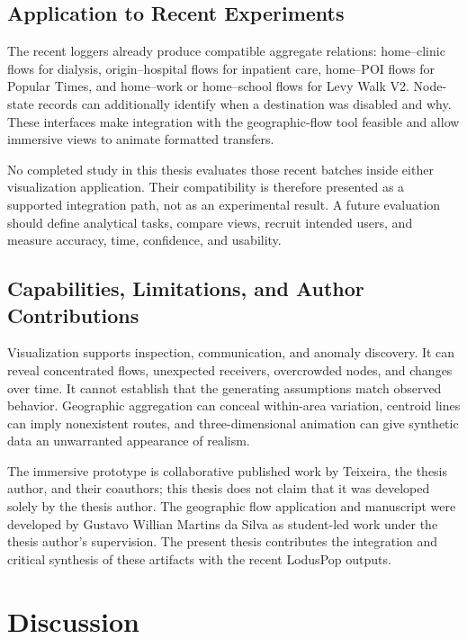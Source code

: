 \documentclass[pdflatex,sn-mathphys-num]{sn-jnl}%
\theoremstyle{thmstyleone}%
\theoremstyle{thmstyletwo}%
\theoremstyle{thmstylethree}%
\begin{document}
\subsection{Application to Recent Experiments}
The recent loggers already produce compatible aggregate relations: home--clinic flows for dialysis, origin--hospital flows for inpatient care, home--POI flows for Popular Times, and home--work or home--school flows for Levy Walk V2. Node-state records can additionally identify when a destination was disabled and why. These interfaces make integration with the geographic-flow tool feasible and allow immersive views to animate formatted transfers.

No completed study in this thesis evaluates those recent batches inside either visualization application. Their compatibility is therefore presented as a supported integration path, not as an experimental result. A future evaluation should define analytical tasks, compare views, recruit intended users, and measure accuracy, time, confidence, and usability.



\subsection{Capabilities, Limitations, and Author Contributions}
Visualization supports inspection, communication, and anomaly discovery. It can reveal concentrated flows, unexpected receivers, overcrowded nodes, and changes over time. It cannot establish that the generating assumptions match observed behavior. Geographic aggregation can conceal within-area variation, centroid lines can imply nonexistent routes, and three-dimensional animation can give synthetic data an unwarranted appearance of realism.

The immersive prototype is collaborative published work by Teixeira, the thesis author, and their coauthors; this thesis does not claim that it was developed solely by the thesis author. The geographic flow application and manuscript were developed by Gustavo Willian Martins da Silva as student-led work under the thesis author's supervision. The present thesis contributes the integration and critical synthesis of these artifacts with the recent LodusPop outputs.



\section{Discussion}
\label{sec:discussion}
\end{document}
